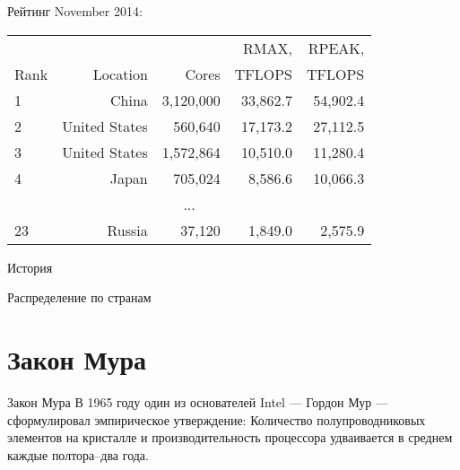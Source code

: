 \begin{frame}{Рейтинг}
November 2014:
\begin{table}[htpb]
    \begin{center}
    \begin{tabular}{|l|r|r|r|r|}
    \hline
            &                   &               &   RMAX,       &   RPEAK,      \\
    Rank    &   Location        &   Cores       &   TFLOPS      &   TFLOPS      \\
    \hline
    1       &   China           &   3,120,000   &   33,862.7    &   54,902.4    \\
    \hline
    2       &   United States   &   560,640     &   17,173.2    &   27,112.5    \\
    \hline
    3       &   United States   &   1,572,864   &   10,510.0    &   11,280.4    \\
    \hline
    4       &   Japan           &   705,024     &   8,586.6     &   10,066.3    \\
    \hline
    \multicolumn{5}{c}{...}                                                     \\
    \hline
    23      &   Russia          &   37,120      &   1,849.0     &   2,575.9     \\
    \hline
    \end{tabular}
    \end{center}
\end{table}
\end{frame}

\begin{frame}{История}
\begin{figure}
\end{figure}
\end{frame}

\begin{frame}{Распределение по странам}
\begin{figure}
\end{figure}
\end{frame}

\section{Закон Мура}

\begin{frame}{Закон Мура}
В 1965 году один из основателей Intel --- Гордон Мур --- сформулировал
эмпирическое утверждение:
\vfill
Количество полупроводниковых элементов на кристалле и производительность
процессора удваивается в среднем каждые полтора--два года.
\end{frame}

